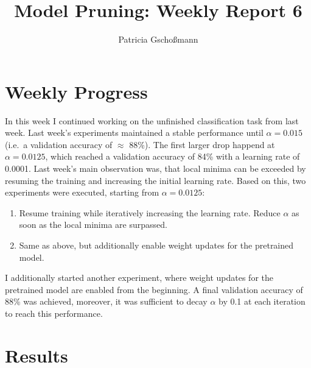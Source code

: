 \documentclass[10pt,twocolumn,letterpaper]{article}
\begin{document}
\title{Model Pruning: Weekly Report 6}
\author{Patricia Gschoßmann}

\maketitle

\section{Weekly Progress}
In this week I continued working on the unfinished classification task from last week.
Last week's experiments maintained a stable performance until $\alpha=0.015$ (i.e.\ a validation accuracy of $\approx$ 88\%).
The first larger drop happend at $\alpha=0.0125$, which reached a validation accuracy of 84\% with a learning rate of 0.0001.
Last week's main observation was, that local minima can be exceeded by resuming the training and increasing the initial learning rate.
Based on this, two experiments were executed, starting from $\alpha=0.0125$:
\begin{enumerate}
	\item Resume training while iteratively increasing the learning rate. Reduce $\alpha$ as soon as the local minima are surpassed.
	\item Same as above, but additionally enable weight updates for the pretrained model.
\end{enumerate}
I additionally started another experiment, where weight updates for the pretrained model are enabled from the beginning.
A final validation accuracy of 88\% was achieved, moreover, it was sufficient to decay $\alpha$ by 0.1 at each iteration to reach this performance.

\section{Results}
\end{document}
